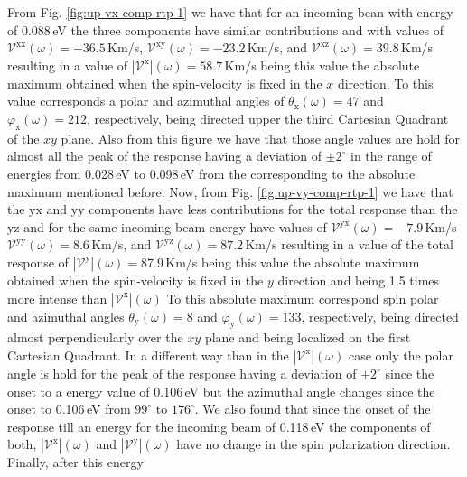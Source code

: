 \documentclass[prb,11pt,tightenlines,twocolumn,aps]{revtex4-1}
\begin{document}
From Fig. \ref{fig:up-vx-comp-rtp-1} we have that for an incoming bean with
energy of 0.088\,eV the three components have similar contributions and with
values of 
% 
$\mathcal{V}^{\mathrm{xx}}(\omega)=-36.5$\,Km/s,
$\mathcal{V}^{\mathrm{xy}}(\omega)=-23.2$\,Km/s, and
$\mathcal{V}^{\mathrm{xz}}(\omega)= 39.8$\,Km/s 
% 
resulting in a value of
% 
$|\mathcal{V}^{\mathrm{x}}|(\omega)=58.7$\,Km/s 
% 
being this value the absolute maximum obtained when the spin-velocity is fixed
in the $x$ direction. To this value corresponds a polar and azimuthal angles of
$\theta_{\mathrm{x}}(\omega)=47$ and $\varphi_{\mathrm{x}}(\omega)=212$,
respectively, being directed upper the third Cartesian Quadrant of the $xy$
plane. Also from this figure we have that those angle values are hold for almost
all the peak of the response having a deviation of $\pm 2^{\circ}$ in the range
of energies from 0.028\,eV to 0.098\,eV from the corresponding to the absolute
maximum mentioned before.
% 
Now, from Fig. \ref{fig:up-vy-comp-rtp-1} we have that the $\mathrm{yx}$ and
$\mathrm{yy}$ components have less contributions for the total response than the
$\mathrm{yz}$ and for the same incoming beam energy have values of
% 
$\mathcal{V}^{\mathrm{yx}}(\omega)= -7.9$\,Km/s 
$\mathcal{V}^{\mathrm{yy}}(\omega)=  8.6$\,Km/s, and
$\mathcal{V}^{\mathrm{yz}}(\omega)= 87.2$\,Km/s 
% 
resulting in a value of the total response of
% 
$|\mathcal{V}^{\mathrm{y}}|(\omega)=87.9$\,Km/s
% 
being this value the absolute maximum obtained when the spin-velocity is fixed
in the $y$ direction and being 1.5 times more intense than
$|\mathcal{V}^{\mathrm{x}}|(\omega)$ To this absolute maximum correspond spin
polar and azimuthal angles $\theta_{\mathrm{y}}(\omega)=8$ and
$\varphi_{\mathrm{y}}(\omega)=133$, respectively, being directed almost
perpendicularly over the $xy$ plane and being localized on the first Cartesian
Quadrant. In a different way than in the $|\mathcal{V}^{\mathrm{x}}|(\omega)$
case only the polar angle is hold for the peak of the response having a
deviation of $\pm 2^{\circ}$ since the onset to a energy value of 0.106\,eV but
the azimuthal angle changes since the onset to 0.106\,eV from $99^{\circ}$ to
$176^{\circ}$.
% 
We also found that since the onset of the response till an
energy for the incoming beam of 0.118\,eV the components of both,
$|\mathcal{V}^{\mathrm{x}}|(\omega)$ and $|\mathcal{V}^{\mathrm{y}}|(\omega)$
have no change in the spin polarization direction. Finally, after this energy
\end{document}
